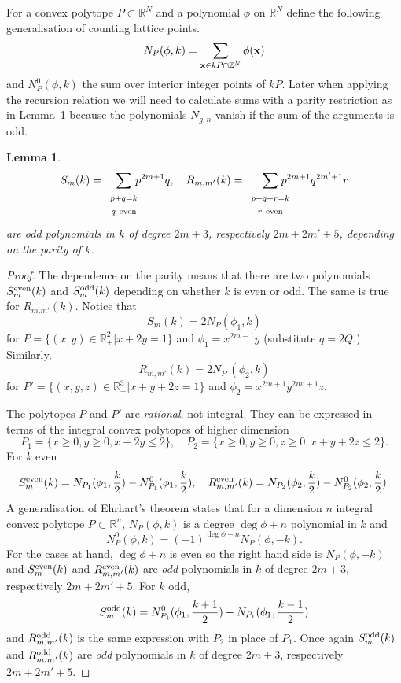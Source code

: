 \documentclass{amsart}
\newtheorem{lemma}{Lemma}
\newcommand{\br}{\mathbb{R}}
\newcommand{\bz}{\mathbb{Z}}
\begin{document}
For a convex polytope $P\subset\br^N$ and a polynomial $\phi$ on $\br^N$ define the following generalisation of counting lattice points.
\[ N_P(\phi,k)=\sum_{{\bf x}\in kP\cap\bz^N}\phi({\bf x})\]
and $N^0_P(\phi,k)$ the sum over interior integer points of $kP$.
Later when applying the recursion relation we will need to calculate sums with a parity restriction as in Lemma~\ref{th:sandr} because the polynomials $N_{g,n}$ vanish if the sum of the arguments is odd.
\begin{lemma}  \label{th:sandr}
\begin{equation}  \label{eq:sandr} 
S_m(k)=\sum_{\begin{array}{c}\scriptstyle p+q=k\\\scriptstyle q{\rm\ even}\end{array}}\hspace{-3mm}p^{2m+1}q,\quad R_{m,m'}(k)=\sum_{\begin{array}{c}\scriptstyle p+q+r=k\\\scriptstyle r{\rm\ even}\end{array}}\hspace{-5mm}p^{2m+1}q^{2m'+1}r
\end{equation}
are {\em odd} polynomials in $k$ of degree $2m+3$, respectively $2m+2m'+5$, depending on the parity of $k$.
\end{lemma}
\begin{proof}
The dependence on the parity means that there are two polynomials $S^{\rm even}_m(k)$ and $S^{\rm odd}_m(k)$ depending on whether $k$ is even or odd.  The same is true for $R_{m.m'}(k)$.  Notice that
\[ S_m(k)=2N_{P}(\phi_1,k)\]
for $P=\{(x,y)\in\br_+^2|x+2y=1\}$ and $\phi_1=x^{2m+1}y$ (substitute $q=2Q$.)  Similarly, 
\[ R_{m,m'}(k)=2N_{P'}(\phi_2,k)\]
for $P'=\{(x,y,z)\in\br_+^3|x+y+2z=1\}$ and $\phi_2=x^{2m+1}y^{2m'+1}z$.  

The polytopes $P$ and $P'$ are {\em rational}, not integral.  They
can be expressed in terms of the integral convex polytopes of higher dimension
\[ P_1=\{x\geq 0, y\geq 0, x+2y\leq 2\},\quad P_2=\{x\geq 0, y\geq 0,z\geq 0,x+y+2z\leq 2\}.\]
For $k$ even
\[ S^{\rm even}_m(k)=N_{P_1}(\phi_1,\frac{k}{2})-N^0_{P_1}(\phi_1,\frac{k}{2}),\quad R^{\rm even}_{m,m'}(k)=N_{P_2}(\phi_2,\frac{k}{2})-N^0_{P_2}(\phi_2,\frac{k}{2}).\]
A generalisation \cite{BVeLat} of Ehrhart's theorem states that for a dimension $n$ integral convex polytope $P\subset\br^n$, $N_P(\phi,k)$ is a degree $\deg\phi+n$ polynomial in $k$ and  
\[ N^0_P(\phi,k)=(-1)^{\deg\phi+n}N_P(\phi,-k).\]
For the cases at hand, $\deg\phi+n$ is even so the right hand side is $N_P(\phi,-k)$ and $S^{\rm even}_m(k)$ and $R^{\rm even}_{m,m'}(k)$ are {\em odd} polynomials in $k$ of degree $2m+3$, respectively $2m+2m'+5$.
For $k$ odd, 
\[ S^{\rm odd}_m(k)=N^0_{P_1}(\phi_1,\frac{k+1}{2})-N_{P_1}(\phi_1,\frac{k-1}{2})\]
and $R^{\rm odd}_{m,m'}(k)$ is the same expression with $P_2$ in place of $P_1$.  Once again $S^{\rm odd}_m(k)$ and $R^{\rm odd}_{m,m'}(k)$ are {\em odd} polynomials in $k$ of degree $2m+3$, respectively $2m+2m'+5$.
\end{proof}
\end{document}
